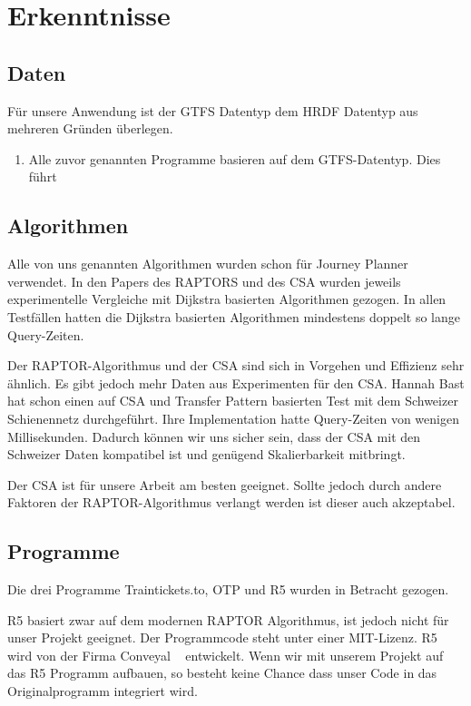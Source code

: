 \section[Erkenntnisse]{Erkenntnisse}
\label{sec:erkenntnisse}

\subsection{Daten}
\label{sec:erkenntnisseDaten}
Für unsere Anwendung ist der GTFS Datentyp dem HRDF Datentyp aus mehreren Gründen überlegen.
\begin{enumerate}
	\item Alle zuvor genannten Programme basieren auf dem GTFS-Datentyp. Dies führt
\end{enumerate}



\subsection{Algorithmen}
\label{sec:erkenntnisseAlgorithmen}
Alle von uns genannten Algorithmen wurden schon für Journey Planner verwendet. In den Papers des RAPTORS und des CSA wurden jeweils experimentelle Vergleiche mit Dijkstra basierten Algorithmen gezogen. In allen Testfällen hatten die Dijkstra basierten Algorithmen mindestens doppelt so lange Query-Zeiten. ~\cite{csa} ~\cite{raptor}

Der RAPTOR-Algorithmus und der CSA sind sich in Vorgehen und Effizienz sehr ähnlich. Es gibt jedoch mehr Daten aus Experimenten für den CSA. Hannah Bast hat schon einen auf CSA und Transfer Pattern basierten Test mit dem Schweizer Schienennetz durchgeführt. Ihre Implementation hatte Query-Zeiten von wenigen Millisekunden. Dadurch können wir uns sicher sein, dass der CSA mit den Schweizer Daten kompatibel ist und genügend Skalierbarkeit mitbringt.~\cite{transferpatterns_esa}

Der CSA ist für unsere Arbeit am besten geeignet. Sollte jedoch durch andere Faktoren der RAPTOR-Algorithmus verlangt werden ist dieser auch akzeptabel.


\subsection{Programme}
\label{sec:erkenntnisseProgramme}
Die drei Programme Traintickets.to, OTP und R5 wurden in Betracht gezogen. 

R5 basiert zwar auf dem modernen RAPTOR Algorithmus, ist jedoch nicht für unser Projekt geeignet. Der Programmcode steht unter einer MIT-Lizenz. R5 wird von der Firma Conveyal ~\cite{conveyal} entwickelt. Wenn wir mit unserem Projekt auf das R5 Programm aufbauen, so besteht keine Chance dass unser Code in das Originalprogramm integriert wird.

